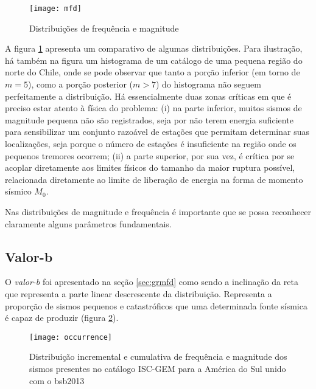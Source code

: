 \begin{figure}[H]
   \centering
   \texttt{[image: mfd]}
   \caption[Distribuições de frequência e magnitude]
   		   {Distribuições de frequência e magnitude} 
   \label{f:mfd}
\end{figure} 

A figura \ref{f:mfd} apresenta um comparativo de algumas distribuições. Para ilustração, 
há também na figura um histograma de um catálogo de
uma pequena região do norte do Chile, onde se pode observar que tanto a porção inferior (em torno de $m=5$), como a porção
posterior ($m > 7$) do histograma não seguem perfeitamente a distribuição. Há essencialmente duas zonas críticas em que é preciso
estar atento à física do problema:
(i) na parte inferior, muitos sismos de magnitude pequena não são registrados, seja por não terem energia suficiente
para sensibilizar um conjunto razoável de estações que permitam determinar suas localizações, seja porque o número de
estações é insuficiente na região onde os pequenos tremores ocorrem; (ii) a parte superior, por sua vez, é crítica
por se acoplar diretamente aos limites físicos do tamanho da maior ruptura possível, relacionada diretamente ao limite de liberação de energia na forma de momento sísmico $M_0$.

Nas distribuições de magnitude e frequência é importante que se possa reconhecer claramente alguns parâmetros
fundamentais.

\subsection{Valor-b}
\label{sec:b_value}

O \emph{valor-b} foi apresentado na seção \ref{sec:grmfd} como sendo a inclinação da reta que representa a parte linear
descrescente da distribuição. Representa a proporção de sismos pequenos e catastróficos que uma determinada fonte sísmica é capaz de
produzir (figura \ref{f:occurrence}).

\begin{figure}[H]
   \centering
   \texttt{[image: occurrence]}
   \caption[Distribuição incremental e cumulativa de frequência e magnitude dos sismos presentes no catálogo ISC-GEM
   para a América do Sul unido com o \gls{bsb2013}]
   {Distribuição incremental e cumulativa de frequência e magnitude dos sismos presentes no catálogo ISC-GEM
   para a América do Sul unido com o \gls{bsb2013}} 
   \label{f:occurrence}
\end{figure} 
 



